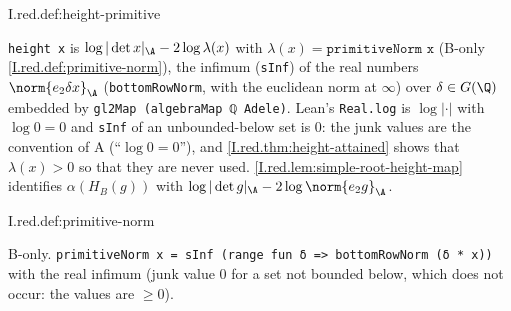 \begin{definition}[height]
\end{definition}
\begin{tfformal}{I.red.def:height-primitive}
\begin{tffidelity}
\texttt{height x} is $\log|\det x|_\A-2\log\lambda(x)$ with $\lambda(x)=\texttt{primitiveNorm x}$ (B-only \cref{I.red.def:primitive-norm}), the infimum (\texttt{sInf}) of the real numbers $\norm{e_2\delta x}_\A$ (\texttt{bottomRowNorm}, with the euclidean norm at $\infty$) over $\delta\in G(\Q)$ embedded by \texttt{gl2Map (algebraMap ℚ Adele)}. Lean's \texttt{Real.log} is $\log|\cdot|$ with $\log0=0$ and \texttt{sInf} of an unbounded-below set is $0$: the junk values are the convention of A (``$\log0=0$''), and \cref{I.red.thm:height-attained} shows that $\lambda(x)>0$ so that they are never used. \cref{I.red.lem:simple-root-height-map} identifies $\alpha(H_B(g))$ with $\log|\det g|_\A-2\log\norm{e_2g}_\A$.
\end{tffidelity}
\end{tfformal}

\begin{definition}
\bonly
{}
\end{definition}
\begin{tfformal}{I.red.def:primitive-norm}
\begin{tffidelity}
B-only. \texttt{primitiveNorm x = sInf (range fun δ => bottomRowNorm (δ * x))} with the real infimum (junk value $0$ for a set not bounded below, which does not occur: the values are $\ge0$).
\end{tffidelity}
\end{tfformal}

